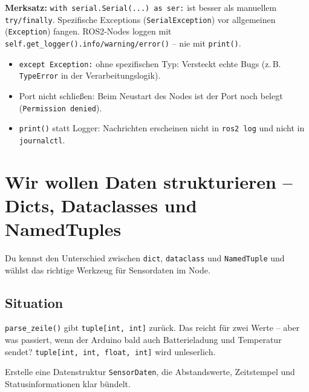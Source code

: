 \begin{merksatzBox}
\textbf{Merksatz:} \texttt{with serial.Serial(...) as ser:} ist besser als
manuellem \texttt{try/finally}. Spezifische Exceptions (\texttt{SerialException})
vor allgemeinen (\texttt{Exception}) fangen. ROS2-Nodes loggen mit
\texttt{self.get\_logger().info/warning/error()} -- nie mit \texttt{print()}.
\end{merksatzBox}

\begin{fehlerBox}
\begin{itemize}
\item \texttt{except Exception:} ohne spezifischen Typ: Versteckt echte Bugs
  (z.\,B. \texttt{TypeError} in der Verarbeitungslogik).
\item Port nicht schließen: Beim Neustart des Nodes
  ist der Port noch belegt (\texttt{Permission denied}).
\item \texttt{print()} statt Logger: Nachrichten erscheinen nicht in
  \texttt{ros2 log} und nicht in \texttt{journalctl}.
\end{itemize}
\end{fehlerBox}


\chapter{Wir wollen Daten strukturieren –
  Dicts, Dataclasses und NamedTuples}

\begin{lernziele}
Du kennst den Unterschied zwischen \texttt{dict},
\texttt{dataclass} und \texttt{NamedTuple} und wählst
das richtige Werkzeug für Sensordaten im Node.
\end{lernziele}

\section{Situation}

\texttt{parse\_zeile()} gibt \texttt{tuple[int, int]} zurück.
Das reicht für zwei Werte -- aber was passiert,
wenn der Arduino bald auch Batterieladung und Temperatur sendet?
\texttt{tuple[int, int, float, int]} wird unleserlich.

\begin{aufgabeBox}
Erstelle eine Datenstruktur \texttt{SensorDaten}, die Abstandswerte,
Zeitstempel und Statusinformationen klar bündelt.
\end{aufgabeBox}

